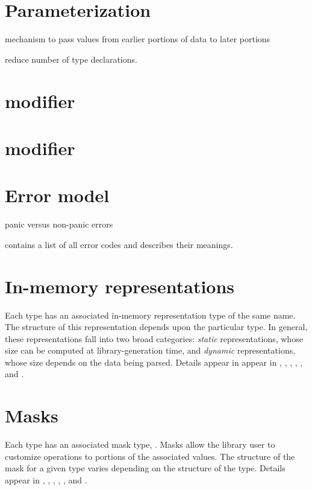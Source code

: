 \section{Parameterization}
\label{sec:common-parameterization}
 mechanism to pass values from earlier portions of data to later
 portions
 
 reduce number of type declarations.


\section{\record{} modifier}

\section{\file{} modifier}

\section{Error model}
\label{sec:common-error-model}
 panic versus non-panic errors

 contains a list of all error codes and
describes their meanings.

\section{In-memory representations}
\label{sec:common-rep}
Each \pads{} type  has an associated in-memory representation
type of the same name.  The structure of this representation depends
upon the particular \pads{} type.  
In general, these representations fall into two broad categories:
\textit{static} representations, whose size can be computed at
library-generation time, and \textit{dynamic} representations, whose size 
depends on the data being parsed. 
Details appear in 
appear in , ,
, , 
, and .

\section{Masks}
\label{sec:common-masks}
Each \pads{} type  has an associated mask type, .
Masks allow the library user to customize operations to portions of
the associated values.  The structure of the mask for a given \pads{}
type varies depending on the structure of the \pads{} type.  Details
appear in , ,
, , 
, and .

